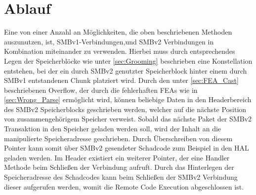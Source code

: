 \documentclass[DIV=12,headings=normal,pdftex,headinclude=false,footinclude=false,final]{scrreprt}
\begin{document}
\section{Ablauf}\label{sec:Ablauf}
Eine von einer Anzahl an Möglichkeiten, die oben beschriebenen Methoden auszunutzen, ist, SMBv1-Verbindungen,und SMBv2 Verbindungen in Kombination miteinander zu verwenden. Hierbei muss durch entsprechendes Legen der Speicherblöcke wie unter \ref{sec:Grooming} beschrieben eine Konstellation entstehen, bei der ein durch SMBv2 genutzter Speicherblock hinter einem durch SMBv1 entstandenen Chunk platziert wird. Durch den unter \ref{sec:FEA_Cast} beschriebenen Overflow, der durch die fehlerhaften FEAs wie in \ref{sec:Wrong_Parse} ermöglicht wird, können beliebige Daten in den Headerbereich des SMBv2 Speicherblocks geschrieben werden, welcher auf die nächste Position von zusammengehörigem Speicher verweist. Sobald das nächste Paket der SMBv2 Transaktion in den Speicher geladen werden soll, wird der Inhalt an die manipulierte Speicheradresse geschrieben. Durch Überschreiben von diesem Pointer kann somit über SMBv2 gesendeter Schadcode zum Beispiel in den HAL geladen werden. Im Header existiert ein weiterer Pointer, der eine Handler Methode beim Schließen der Verbindung aufruft\cite{CP}. Durch das Hinterlegen der Speicheradresse des Schadcodes kann beim Schließen der SMBv2 Verbindung dieser aufgerufen werden, womit die Remote Code Execution abgeschlossen ist\cite{SS:EB}.
\end{document}
